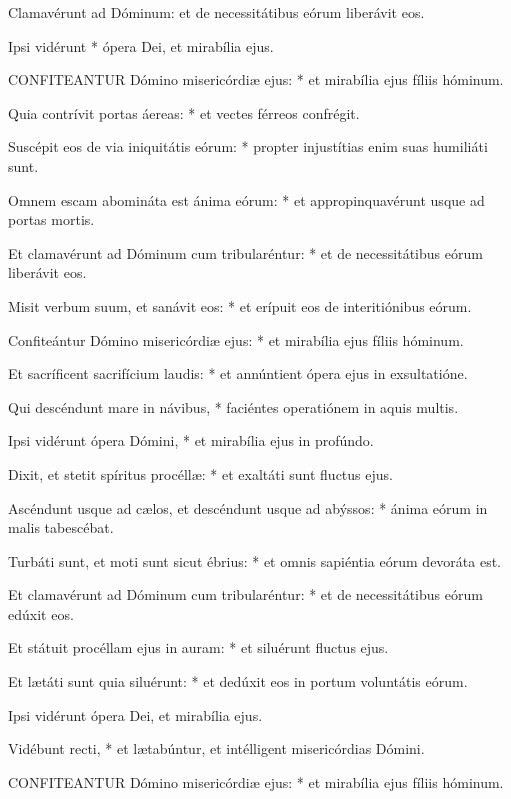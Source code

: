  Clamavérunt ad Dóminum: et de necessitátibus eórum liberávit eos.

 Ipsi vidérunt * ópera Dei, et mirabília ejus.


\lettrine[lines=2]{C}{ONFITEANTUR} Dómino misericórdiæ ejus: * et mirabília ejus fíliis hóminum.

Quia contrívit portas áereas: * et vectes férreos confrégit.

Suscépit eos de via iniquitátis eórum: * propter injustítias enim suas humiliáti sunt.

Omnem escam abomináta est ánima eórum: * et appropinquavérunt usque ad portas mortis.

Et clamavérunt ad Dóminum cum tribularéntur: * et de necessitátibus eórum liberávit eos.

Misit verbum suum, et sanávit eos: * et erípuit eos de interitiónibus eórum.

Confiteántur Dómino misericórdiæ ejus: * et mirabília ejus fíliis hóminum.

Et sacríficent sacrifícium laudis: * et annúntient ópera ejus in exsultatióne.

Qui descéndunt mare in návibus, * faciéntes operatiónem in aquis multis.

Ipsi vidérunt ópera Dómini, * et mirabília ejus in profúndo.

Dixit, et stetit spíritus procéllæ: * et exaltáti sunt fluctus ejus.

Ascéndunt usque ad cælos, et descéndunt usque ad abýssos: * ánima eórum in malis tabescébat.

Turbáti sunt, et moti sunt sicut ébrius: * et omnis sapiéntia eórum devoráta est.

Et clamavérunt ad Dóminum cum tribularéntur: * et de necessitátibus eórum edúxit eos.

Et státuit procéllam ejus in auram: * et siluérunt fluctus ejus.

Et lætáti sunt quia siluérunt: * et dedúxit eos in portum voluntátis eórum.

 Ipsi vidérunt ópera Dei, et mirabília ejus.

 Vidébunt recti, * et lætabúntur, et intélligent misericórdias Dómini.


\lettrine[lines=2]{C}{ONFITEANTUR} Dómino misericórdiæ ejus: * et mirabília ejus fíliis hóminum.

